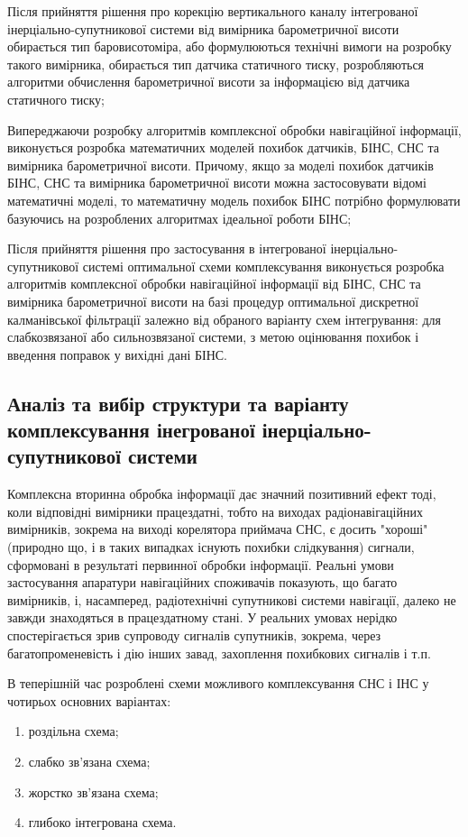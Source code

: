 Після прийняття рішення про корекцію вертикального каналу інтегрованої 
інерціально-супутникової системи від вимірника барометричної висоти обирається 
тип баровисотоміра, або формулюються технічні вимоги на розробку такого 
вимірника, обирається тип датчика статичного тиску, розробляються алгоритми 
обчислення барометричної висоти за інформацією від датчика статичного тиску;

Випереджаючи розробку алгоритмів комплексної обробки навігаційної 
інформації, виконується розробка математичних моделей похибок датчиків, 
БІНС, СНС та вимірника барометричної висоти. Причому, якщо за моделі 
похибок датчиків БІНС, СНС та вимірника барометричної висоти можна 
застосовувати відомі математичні моделі, то математичну модель похибок 
БІНС потрібно формулювати базуючись на розроблених алгоритмах ідеальної 
роботи БІНС;

Після прийняття рішення про застосування в інтегрованої інерціально-супутникової 
системі оптимальної схеми комплексування виконується розробка алгоритмів 
комплексної обробки навігаційної інформації від БІНС, СНС та вимірника 
барометричної висоти на базі процедур оптимальної дискретної калманівської 
фільтрації залежно від обраного варіанту схем інтегрування: для слабкозвязаної 
або сильнозвязаної системи, з метою оцінювання похибок і введення поправок у 
вихідні дані БІНС.

\subsection{Аналіз та вибір структури та варіанту комплексування інегрованої
інерціально-супутникової системи}

Комплексна вторинна обробка інформації дає значний позитивний ефект тоді, 
коли відповідні вимірники працездатні, тобто на виходах радіонавігаційних 
вимірників, зокрема на виході корелятора приймача СНС,  є досить "хороші" 
(природно що, і в таких випадках  існують похибки слідкування) сигнали, 
сформовані в результаті первинної обробки інформації. Реальні умови застосування 
апаратури навігаційних споживачів показують, що багато вимірників, і, насамперед, 
радіотехнічні супутникові системи навігації, далеко не завжди знаходяться в 
працездатному стані. У реальних умовах нерідко спостерігається зрив супроводу 
сигналів супутників, зокрема, через багатопроменевість і дію інших завад, 
захоплення похибкових сигналів і т.п.

В теперішній час розроблені схеми можливого комплексування СНС і ІНС у чотирьох 
основних варіантах:
\begin{enumerate}
\item роздільна схема;
\item слабко зв'язана схема;
\item жорстко зв'язана схема;
\item глибоко інтегрована схема.
\end{enumerate}

